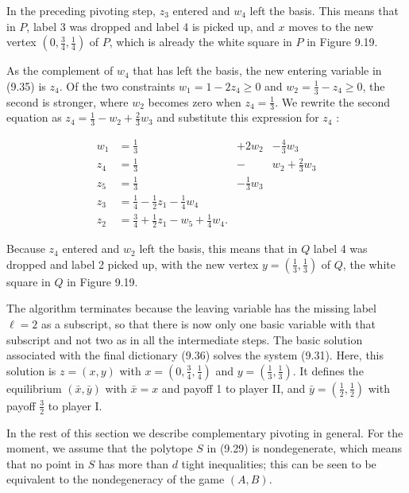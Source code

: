 \documentclass[12pt]{article}
\begin{document}
In the preceding pivoting step, $z_{3}$ entered and $w_{4}$ left the basis. This means that in $P$, label 3 was dropped and label 4 is picked up, and $x$ moves to the new vertex $\left(0, \frac{3}{4}, \frac{1}{4}\right)$ of $P$, which is already the white square in $P$ in Figure 9.19.

As the complement of $w_{4}$ that has left the basis, the new entering variable in (9.35) is $z_{4}$. Of the two constraints $w_{1}=1-2 z_{4} \geq 0$ and $w_{2}=\frac{1}{3}-z_{4} \geq 0$, the second is stronger, where $w_{2}$ becomes zero when $z_{4}=\frac{1}{3}$. We rewrite the second equation as $z_{4}=\frac{1}{3}-w_{2}+\frac{2}{3} w_{3}$ and substitute this expression for $z_{4}$ :

\[
\begin{array}{rlrl}
w_{1} & =\frac{1}{3} & +2 w_{2} & -\frac{4}{3} w_{3} \\
z_{4} & =\frac{1}{3} & - & w_{2}+\frac{2}{3} w_{3} \\
z_{5} & =\frac{1}{3} & -\frac{1}{3} w_{3}  \tag{9.36}\\
z_{3} & =\frac{1}{4}-\frac{1}{2} z_{1}-\frac{1}{4} w_{4} & \\
z_{2} & =\frac{3}{4}+\frac{1}{2} z_{1}-w_{5}+\frac{1}{4} w_{4} . &
\end{array}
\]

Because $z_{4}$ entered and $w_{2}$ left the basis, this means that in $Q$ label 4 was dropped and label 2 picked up, with the new vertex $y=\left(\frac{1}{3}, \frac{1}{3}\right)$ of $Q$, the white square in $Q$ in Figure 9.19.

The algorithm terminates because the leaving variable has the missing label $\ell=2$ as a subscript, so that there is now only one basic variable with that subscript and not two as in all the intermediate steps. The basic solution associated with the final dictionary (9.36) solves the system (9.31). Here, this solution is $z=(x, y)$ with $x=\left(0, \frac{3}{4}, \frac{1}{4}\right)$ and $y=\left(\frac{1}{3}, \frac{1}{3}\right)$. It defines the equilibrium $(\bar{x}, \bar{y})$ with $\bar{x}=x$ and payoff 1 to player II, and $\bar{y}=\left(\frac{1}{2}, \frac{1}{2}\right)$ with payoff $\frac{3}{2}$ to player I.

In the rest of this section we describe complementary pivoting in general. For the moment, we assume that the polytope $S$ in (9.29) is nondegenerate, which means that no point in $S$ has more than $d$ tight inequalities; this can be seen to be equivalent to the nondegeneracy of the game $(A, B)$.
\end{document}
